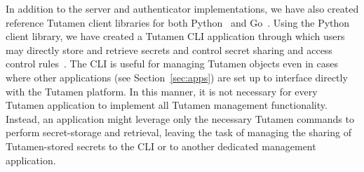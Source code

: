 In addition to the server and authenticator implementations, we have
also created reference Tutamen client libraries for both
Python~\cite{src-tutamen-pytutamen} and
Go~\cite{src-tutamen-go}. Using the Python client library, we have
created a Tutamen CLI application through which users may directly
store and retrieve secrets and control secret sharing and access
control rules~\cite{src-tutamen-cli}. The CLI is useful for managing
Tutamen objects even in cases where other applications (see
Section~\ref{sec:apps}) are set up to interface directly with the
Tutamen platform. In this manner, it is not necessary for every
Tutamen application to implement all Tutamen management
functionality. Instead, an application might leverage only the
necessary Tutamen commands to perform secret-storage and retrieval,
leaving the task of managing the sharing of Tutamen-stored secrets to
the CLI or to another dedicated management application.

